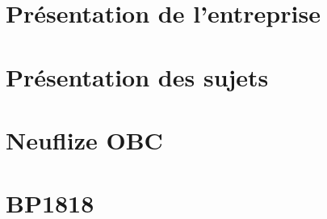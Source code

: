 \documentclass[11pt,twoside]{scrreprt}
\begin{document}
\chapter{Présentation de l'entreprise}

	


\chapter{Présentation des sujets}
	
	
	
\chapter{Neuflize OBC}

	
	

\chapter{BP1818}

	
	
\end{document}
